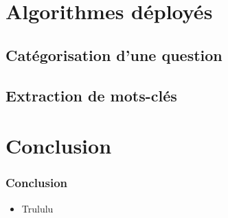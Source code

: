 \documentclass[xcolor=dvipsnames]{beamer}
\begin{document}
\section{Algorithmes déployés}
\subsection{Catégorisation d'une question}
\subsection{Extraction de mots-clés}
\section{Conclusion}
\frame
{
    \frametitle{Conclusion}
    \begin{itemize}
      \item<1-> Trululu
    \end{itemize}
}
\end{document}
